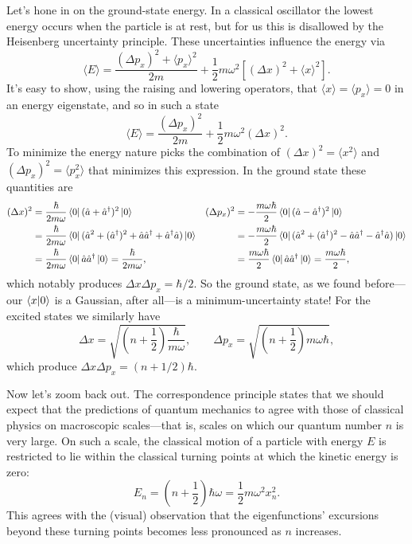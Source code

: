 \documentclass[../p116main.tex]{subfiles}
\begin{document}
Let's hone in on the ground-state energy.
In a classical oscillator the lowest energy occurs when the particle is at rest, but for us this is disallowed by the Heisenberg uncertainty principle.
These uncertainties influence the energy via
\[ \langle E \rangle = \frac{(\Delta p_x)^2 + \langle p_x \rangle^2}{2m} + \frac{1}{2} m\omega^2 [(\Delta x)^2 + \langle x \rangle^2]. \]
It's easy to show, using the raising and lowering operators, that $\langle x \rangle = \langle p_x \rangle = 0$ in an energy eigenstate, and so in such a state
\[ \langle E \rangle = \frac{(\Delta p_x)^2}{2m} + \frac{1}{2} m\omega^2 (\Delta x)^2. \]
To minimize the energy nature picks the combination of $(\Delta x)^2 = \langle x^2 \rangle$ and $(\Delta p_x)^2 = \langle p_x^2 \rangle$ that minimizes this expression.
In the ground state these quantities are
\begin{align*}
    (\Delta x)^2 &= \frac{\hbar}{2m \omega} \left< 0 \right| (\hat a + \hat a^\dagger)^2 \left| 0 \right> & (\Delta p_x)^2 &= -\frac{m\omega \hbar}{2} \left< 0 \right| (\hat a - \hat a^\dagger)^2 \left| 0 \right> \\
    &= \frac{\hbar}{2m \omega} \left< 0 \right| (\hat a^2 + (\hat a^\dagger)^2 + \hat a \hat a^\dagger + \hat a^\dagger \hat a) \left| 0 \right> &&= -\frac{m\omega \hbar}{2} \left< 0 \right| (\hat a^2 + (\hat a^\dagger)^2 - \hat a \hat a^\dagger - \hat a^\dagger \hat a) \left| 0 \right> \\
    &= \frac{\hbar}{2m\omega} \left< 0 \right| \hat a \hat a^\dagger \left| 0 \right> = \frac{\hbar}{2m\omega}, &&= \frac{m\omega \hbar}{2} \left< 0 \right| \hat a \hat a^\dagger \left| 0 \right> = \frac{m\omega\hbar}{2},
\end{align*}
which notably produces $\Delta x \Delta p_x = \hbar / 2$.
So the ground state, as we found before---our $\left< x \middle| 0 \right>$ is a Gaussian, after all---is a minimum-uncertainty state!
For the excited states we similarly have
\[ \Delta x = \sqrt{\left( n + \frac{1}{2} \right) \frac{\hbar}{m\omega}}, \qquad \Delta p_x = \sqrt{\left( n + \frac{1}{2} \right) m\omega \hbar}, \]
which produce $\Delta x \Delta p_x = (n + 1 / 2) \hbar$.

Now let's zoom back out.
The correspondence principle states that we should expect that the predictions of quantum mechanics to agree with those of classical physics on macroscopic scales---that is, scales on which our quantum number $n$ is very large.
On such a scale, the classical motion of a particle with energy $E$ is restricted to lie within the classical turning points at which the kinetic energy is zero:
\[ E_n = \left( n + \frac{1}{2} \right) \hbar \omega = \frac{1}{2} m \omega^2 x_n^2. \]
This agrees with the (visual) observation that the eigenfunctions' excursions beyond these turning points becomes less pronounced as $n$ increases.
\end{document}
